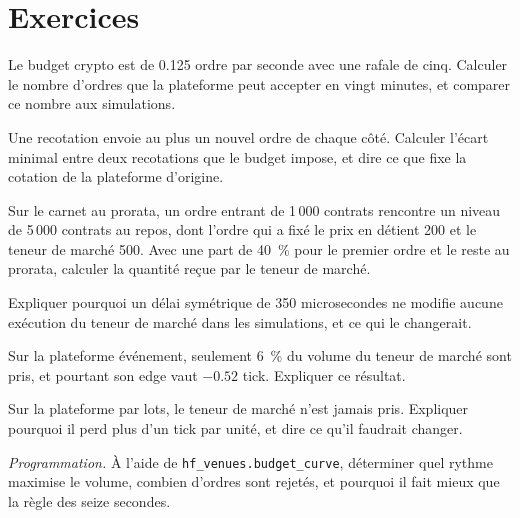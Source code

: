 \section{Exercices}

\begin{exercise}[$\star$]\label{exo:hf:a-venue-playbook:1}
Le budget crypto est de 0.125 ordre par seconde avec une rafale de cinq. Calculer le nombre d'ordres que la plateforme peut accepter en vingt minutes, et
comparer ce nombre aux simulations.
\end{exercise}

\begin{exercise}[$\star$]\label{exo:hf:a-venue-playbook:2}
Une recotation envoie au plus un nouvel ordre de chaque côté. Calculer l'écart minimal entre deux recotations que le budget impose, et
dire ce que fixe la cotation de la plateforme d'origine.
\end{exercise}

\begin{exercise}[$\star$]\label{exo:hf:a-venue-playbook:3}
Sur le carnet au prorata, un ordre entrant de 1\,000 contrats rencontre un niveau de 5\,000 contrats au repos, dont l'ordre qui a fixé le prix en détient
200 et le teneur de marché 500. Avec une part de 40~\% pour le premier ordre et le reste au prorata, calculer la quantité reçue par le teneur de marché.
\end{exercise}

\begin{exercise}[$\star\star$]\label{exo:hf:a-venue-playbook:4}
Expliquer pourquoi un délai symétrique de 350 microsecondes ne modifie aucune exécution du teneur de marché dans les simulations, et ce qui le changerait.
\end{exercise}

\begin{exercise}[$\star\star$]\label{exo:hf:a-venue-playbook:5}
Sur la plateforme événement, seulement 6~\% du volume du teneur de marché sont pris, et pourtant son edge vaut $-0.52$ tick. Expliquer ce résultat.
\end{exercise}

\begin{exercise}[$\star\star$]\label{exo:hf:a-venue-playbook:6}
Sur la plateforme par lots, le teneur de marché n'est jamais pris. Expliquer pourquoi il perd plus d'un tick par unité, et dire ce qu'il faudrait changer.
\end{exercise}

\begin{exercise}[$\star\star\star$]\label{exo:hf:a-venue-playbook:7}
\emph{Programmation.} À l'aide de \texttt{hf\_venues.budget\_curve}, déterminer quel rythme maximise le volume, combien d'ordres sont rejetés, et
pourquoi il fait mieux que la règle des seize secondes.
\end{exercise}

